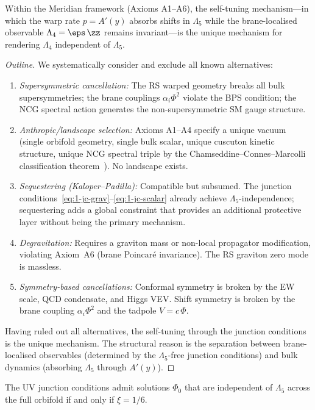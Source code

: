 \begin{theorem}
\label{thm:1-uniqueness}
Within the Meridian framework (Axioms A1--A6), the self-tuning mechanism---in which the warp rate $p = A'(y)$ absorbs shifts in $\Lambda_5$ while the brane-localised observable $\Lambda_4 = \eps\,\zz$ remains invariant---is the unique mechanism for rendering $\Lambda_4$ independent of $\Lambda_5$.
\end{theorem}

\begin{proof}[Outline]
We systematically consider and exclude all known alternatives:
\begin{enumerate}
\item \emph{Supersymmetric cancellation:} The RS warped geometry breaks all bulk supersymmetries; the brane couplings $\alpha_i\Phi^2$ violate the BPS condition; the NCG spectral action generates the non-supersymmetric SM gauge structure.
\item \emph{Anthropic/landscape selection:} Axioms A1--A4 specify a unique vacuum (single orbifold geometry, single bulk scalar, unique cuscuton kinetic structure, unique NCG spectral triple by the Chamseddine--Connes--Marcolli classification theorem~\cite{ch1:ccm07}). No landscape exists.
\item \emph{Sequestering (Kaloper--Padilla):} Compatible but subsumed. The junction conditions~\eqref{eq:1-jc-grav}--\eqref{eq:1-jc-scalar} already achieve $\Lambda_5$-independence; sequestering adds a global constraint that provides an additional protective layer without being the primary mechanism.
\item \emph{Degravitation:} Requires a graviton mass or non-local propagator modification, violating Axiom~A6 (brane Poincar\'e invariance). The RS graviton zero mode is massless.
\item \emph{Symmetry-based cancellations:} Conformal symmetry is broken by the EW scale, QCD condensate, and Higgs VEV. Shift symmetry is broken by the brane coupling $\alpha_i\Phi^2$ and the tadpole $V = c\,\Phi$.
\end{enumerate}
Having ruled out all alternatives, the self-tuning through the junction conditions is the unique mechanism. The structural reason is the separation between brane-localised observables (determined by the $\Lambda_5$-free junction conditions) and bulk dynamics (absorbing $\Lambda_5$ through $A'(y)$). \qedhere
\end{proof}

\begin{theorem}[Necessity of $\xi = 1/6$]
\label{thm:1-xi-necessity}
The UV junction conditions admit solutions $\Phi_0$ that are independent of $\Lambda_5$ across the full orbifold if and only if $\xi = 1/6$.
\end{theorem}

